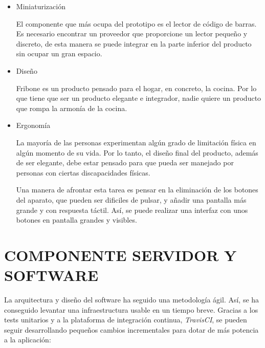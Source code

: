 \begin{itemize}
    \item Miniaturización

        El componente que más ocupa del prototipo es el lector de código de barras. Es necesario encontrar un proveedor que proporcione un lector pequeño y discreto, de esta manera se puede integrar en la parte inferior del producto sin ocupar un gran espacio.

    \item Diseño

        Fribone es un producto pensado para el hogar, en concreto, la cocina. Por lo que tiene que ser un producto elegante e integrador, nadie quiere un producto que rompa la armonía de la cocina.

    \item Ergonomía

        La mayoría de las personas experimentan algún grado de limitación física en algún momento de su vida. Por lo tanto, el diseño final del producto, además de ser elegante, debe estar pensado para que pueda ser manejado por personas con ciertas discapacidades físicas.

        Una manera de afrontar esta tarea es pensar en la eliminación de los botones del aparato, que pueden ser dificiles de pulsar, y añadir una pantalla más grande y con respuesta táctil. Así, se puede realizar una interfaz con unos botones en pantalla grandes y visibles.

\end{itemize}

\section{COMPONENTE SERVIDOR Y SOFTWARE}

La arquitectura y diseño del software ha seguido una metodología ágil. Así, se ha conseguido levantar una infraestructura usable en un tiempo breve. Gracias a los tests unitarios y a la plataforma de integración continua, \emph{TravisCI}, se pueden seguir desarrollando pequeños cambios incrementales para dotar de más potencia a la aplicación:

